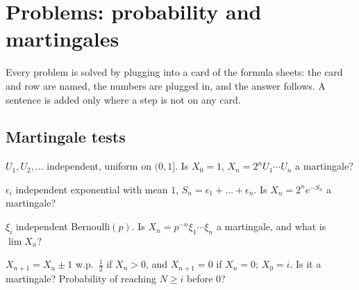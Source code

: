 \chapter{Problems: probability and martingales}
\label{ch:prob-mg}

\begin{whatfor}
Every problem is solved by plugging into a card of the formula sheets: the card and row are named, the numbers are plugged in, and the answer follows. A sentence is added only where a step is not on any card.
\end{whatfor}

\section{Martingale tests}

\begin{problem}
$U_1,U_2,\ldots$ independent, uniform on $(0,1]$. Is $X_0=1$, $X_n=2^nU_1\cdots U_n$ a martingale?
\end{problem}

\begin{problem}
$\epsilon_i$ independent exponential with mean $1$, $S_n=\epsilon_1+\dots+\epsilon_n$. Is $X_n=2^ne^{-S_n}$ a martingale?
\end{problem}

\begin{problem}
$\xi_i$ independent Bernoulli$(p)$. Is $X_n=p^{-n}\xi_1\cdots\xi_n$ a martingale, and what is $\lim X_n$?
\end{problem}

\begin{problem}
$X_{n+1}=X_n\pm1$ w.p.\ $\frac12$ if $X_n>0$, and $X_{n+1}=0$ if $X_n=0$; $X_0=i$. Is it a martingale? Probability of reaching $N\ge i$ before $0$?
\end{problem}

